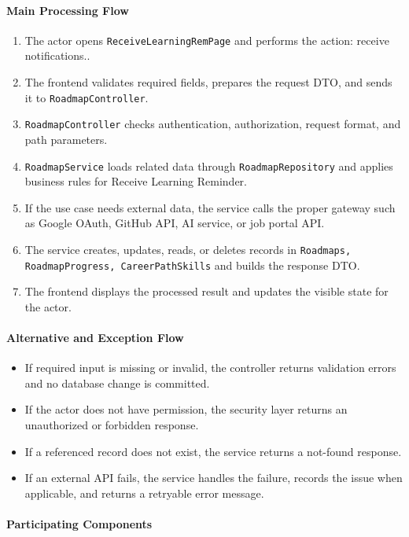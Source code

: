 \paragraph{Main Processing Flow}

\begin{enumerate}
    \item The actor opens \texttt{ReceiveLearningRemPage} and performs the action: receive notifications..
    \item The frontend validates required fields, prepares the request DTO, and sends it to \texttt{RoadmapController}.
    \item \texttt{RoadmapController} checks authentication, authorization, request format, and path parameters.
    \item \texttt{RoadmapService} loads related data through \texttt{RoadmapRepository} and applies business rules for Receive Learning Reminder.
    \item If the use case needs external data, the service calls the proper gateway such as Google OAuth, GitHub API, AI service, or job portal API.
    \item The service creates, updates, reads, or deletes records in \texttt{Roadmaps, RoadmapProgress, CareerPathSkills} and builds the response DTO.
    \item The frontend displays the processed result and updates the visible state for the actor.
\end{enumerate}

\paragraph{Alternative and Exception Flow}

\begin{itemize}
    \item If required input is missing or invalid, the controller returns validation errors and no database change is committed.
    \item If the actor does not have permission, the security layer returns an unauthorized or forbidden response.
    \item If a referenced record does not exist, the service returns a not-found response.
    \item If an external API fails, the service handles the failure, records the issue when applicable, and returns a retryable error message.
\end{itemize}

\paragraph{Participating Components}

